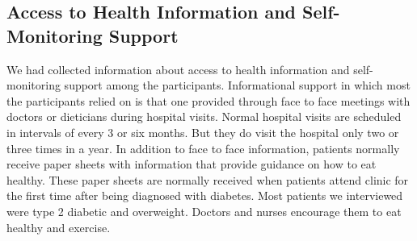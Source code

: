 \subsection{Access to Health Information and Self-Monitoring Support}
We had collected information about access to health information and self-monitoring support among the participants. Informational support in which most the participants relied on is that one provided through face to face meetings with doctors or dieticians during hospital visits. Normal hospital visits are scheduled in intervals of every 3 or six months. But they do visit the hospital only two or three times in a year. In addition to face to face information, patients normally receive paper sheets with information that provide guidance on how to eat healthy. These paper sheets are normally received when patients attend clinic for the first time after being diagnosed with diabetes. Most patients we interviewed were type 2 diabetic and overweight. Doctors and nurses encourage them to eat healthy and exercise. 

